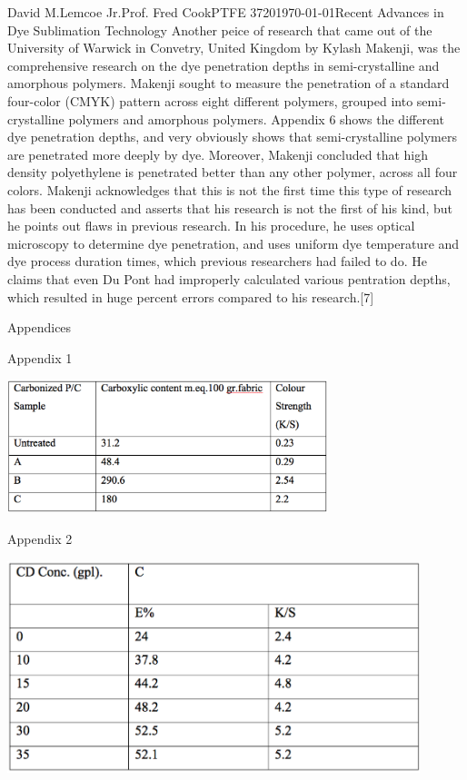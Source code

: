 \documentclass[12pt,letterpaper]{article}
\begin{document}
\begin{mla}{David M.}{Lemcoe Jr.}{Prof. Fred Cook}{PTFE 3720}{\today}{Recent Advances in Dye Sublimation Technology}
Another peice of research that came out of the University of Warwick in Convetry, United Kingdom by Kylash Makenji, was the comprehensive research on the dye penetration depths in semi-crystalline and amorphous polymers. Makenji sought to measure the penetration of a standard four-color (CMYK) pattern across eight different polymers, grouped into semi-crystalline polymers and amorphous polymers. Appendix 6 shows the different dye penetration depths, and very obviously shows that semi-crystalline polymers are penetrated more deeply by dye. Moreover, Makenji concluded that high density polyethylene is penetrated better than any other polymer, across all four colors. Makenji acknowledges that this is not the first time this type of research has been conducted and asserts that his research is not the first of his kind, but he points out flaws in previous research. In his procedure, he uses optical microscopy to determine dye penetration, and uses uniform dye temperature and dye process duration times, which previous researchers had failed to do. He claims that even Du Pont had improperly calculated various pentration depths, which resulted in huge percent errors compared to his research.[7]



\newpage
\begin{center}
Appendices
\end{center}

Appendix 1
\begin{center}
\includegraphics[width=0.7\textwidth]{1}
\end{center}

Appendix 2
\begin{center}
\includegraphics[width=0.9\textwidth]{2}
\end{center}


\end{mla}
\end{document}
